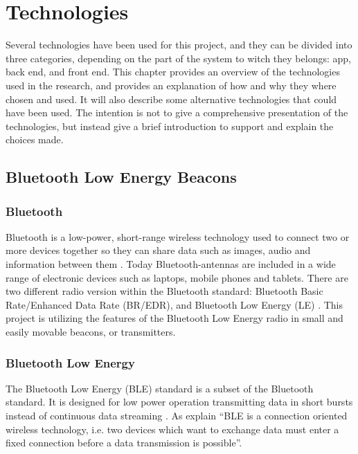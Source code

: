 \documentclass[../Main/thesis.tex]{subfiles}
\begin{document}
\chapter{Technologies}
\label{ch:technologies}

Several technologies have been used for this project, and they can be divided into three categories, depending on the part of the system to witch they belongs: app, back end, and front end.
This chapter provides an overview of the technologies used in the research, and provides an explanation of how and why they where chosen and used.
It will also describe some alternative technologies that could have been used.
The intention is not to give a comprehensive presentation of the technologies, but instead give a brief introduction to support and explain the choices made.

\section{Bluetooth Low Energy Beacons}

\subsection{Bluetooth}
Bluetooth is a low-power, short-range wireless technology used to connect two or more devices together so they can share data such as images, audio and information between them \citep{bluetooth-how}.
Today Bluetooth-antennas are included in a wide range of electronic devices such as laptops, mobile phones and tablets.
There are two different radio version within the Bluetooth standard: Bluetooth Basic Rate/Enhanced Data Rate (BR/EDR), and Bluetooth Low Energy (LE) \citep{BluetoothSpecialInterestGroup2018}.
This project is utilizing the features of the Bluetooth Low Energy radio in small and easily movable beacons, or transmitters.

\subsection{Bluetooth Low Energy}
The Bluetooth Low Energy (BLE) standard is a subset of the Bluetooth standard.
It is designed for low power operation transmitting data in short bursts instead of continuous data streaming \citep{BluetoothSpecialInterestGroup2018}.
As \citet[p. 2]{Mackensen2012} explain ``BLE is a connection oriented wireless technology, i.e. two devices  which  want  to  exchange  data  must  enter  a  fixed connection before a data transmission is possible''.
\end{document}
